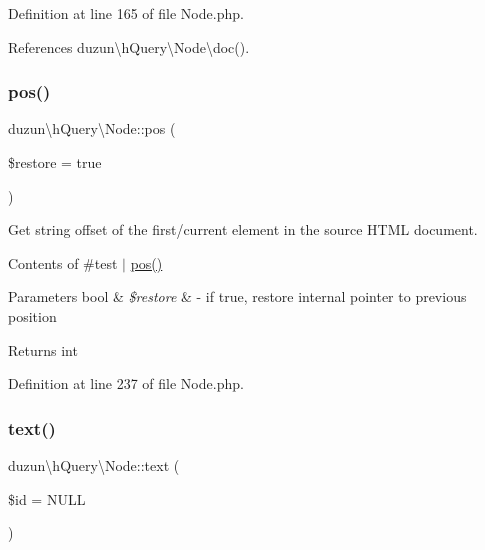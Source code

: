 Definition at line 165 of file Node.\+php.



References duzun\textbackslash{}h\+Query\textbackslash{}\+Node\textbackslash{}doc().

\mbox{\label{classduzun_1_1hQuery_1_1Node_a781a7e7f2540c4787915407279683e6f}} 
\subsubsection{\texorpdfstring{pos()}{pos()}}
{\footnotesize\ttfamily duzun\textbackslash{}h\+Query\textbackslash{}\+Node\+::pos (\begin{DoxyParamCaption}\item[{}]{\$restore = {\ttfamily true} }\end{DoxyParamCaption})}

Get string offset of the first/current element in the source H\+T\+ML document.

 Contents of \#test  $\vert$ \mbox{\hyperlink{classduzun_1_1hQuery_1_1Node_a781a7e7f2540c4787915407279683e6f}{pos()}}


\begin{DoxyParams}[1]{Parameters}
bool & {\em \$restore} & -\/ if true, restore internal pointer to previous position\\
\hline
\end{DoxyParams}
\begin{DoxyReturn}{Returns}
int 
\end{DoxyReturn}


Definition at line 237 of file Node.\+php.

\mbox{\label{classduzun_1_1hQuery_1_1Node_ad5395ffe77dd4f111fcc7f59d211fbfa}} 
\subsubsection{\texorpdfstring{text()}{text()}}
{\footnotesize\ttfamily duzun\textbackslash{}h\+Query\textbackslash{}\+Node\+::text (\begin{DoxyParamCaption}\item[{}]{\$id = {\ttfamily NULL} }\end{DoxyParamCaption})}

